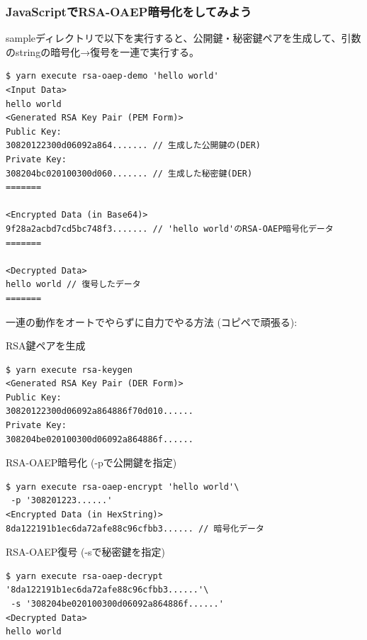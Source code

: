 \documentclass[12pt,dvipdfmx]{beamer}
\begin{document}
\begin{frame}[fragile]
\frametitle{JavaScriptでRSA-OAEP暗号化をしてみよう}
sampleディレクトリで以下を実行すると、公開鍵・秘密鍵ペアを生成して、引数のstringの暗号化→復号を一連で実行する。
\begin{exampleblock}{}
\scriptsize
\begin{verbatim}
$ yarn execute rsa-oaep-demo 'hello world'
<Input Data>
hello world
<Generated RSA Key Pair (PEM Form)>
Public Key:
30820122300d06092a864....... // 生成した公開鍵の(DER)
Private Key:
308204bc020100300d060....... // 生成した秘密鍵(DER)
=======

<Encrypted Data (in Base64)>
9f28a2acbd7cd5bc748f3....... // 'hello world'のRSA-OAEP暗号化データ
=======

<Decrypted Data>
hello world // 復号したデータ
=======
\end{verbatim}
\end{exampleblock}
\end{frame}

\begin{frame}[fragile]
\small
一連の動作をオートでやらずに自力でやる方法 (コピペで頑張る):
\begin{exampleblock}{\small RSA鍵ペアを生成}
\scriptsize
\begin{verbatim}
$ yarn execute rsa-keygen
<Generated RSA Key Pair (DER Form)>
Public Key:
30820122300d06092a864886f70d010......
Private Key:
308204be020100300d06092a864886f......
\end{verbatim}
\end{exampleblock}
\begin{exampleblock}{\small RSA-OAEP暗号化 (-pで公開鍵を指定)}
\scriptsize
\begin{verbatim}
$ yarn execute rsa-oaep-encrypt 'hello world'\
 -p '308201223......'
<Encrypted Data (in HexString)>
8da122191b1ec6da72afe88c96cfbb3...... // 暗号化データ
\end{verbatim}
\end{exampleblock}
\begin{exampleblock}{\small RSA-OAEP復号 (-sで秘密鍵を指定)}
\scriptsize
\begin{verbatim}
$ yarn execute rsa-oaep-decrypt '8da122191b1ec6da72afe88c96cfbb3......'\
 -s '308204be020100300d06092a864886f......'
<Decrypted Data>
hello world
\end{verbatim}
\end{exampleblock}
\end{frame}
\end{document}
